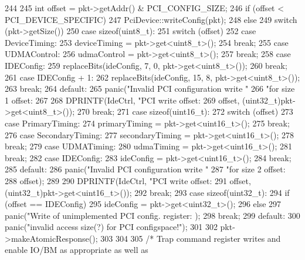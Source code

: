 \begin{DoxyCode}
244 {
245     int offset = pkt->getAddr() & PCI_CONFIG_SIZE;
246     if (offset < PCI_DEVICE_SPECIFIC) {
247         PciDevice::writeConfig(pkt);
248     } else {
249         switch (pkt->getSize()) {
250           case sizeof(uint8_t):
251             switch (offset) {
252               case DeviceTiming:
253                 deviceTiming = pkt->get<uint8_t>();
254                 break;
255               case UDMAControl:
256                 udmaControl = pkt->get<uint8_t>();
257                 break;
258               case IDEConfig:
259                 replaceBits(ideConfig, 7, 0, pkt->get<uint8_t>());
260                 break;
261               case IDEConfig + 1:
262                 replaceBits(ideConfig, 15, 8, pkt->get<uint8_t>());
263                 break;
264               default:
265                 panic("Invalid PCI configuration write "
266                         "for size 1 offset: %
267             }
268             DPRINTF(IdeCtrl, "PCI write offset: %
269                     offset, (uint32_t)pkt->get<uint8_t>());
270             break;
271           case sizeof(uint16_t):
272             switch (offset) {
273               case PrimaryTiming:
274                 primaryTiming = pkt->get<uint16_t>();
275                 break;
276               case SecondaryTiming:
277                 secondaryTiming = pkt->get<uint16_t>();
278                 break;
279               case UDMATiming:
280                 udmaTiming = pkt->get<uint16_t>();
281                 break;
282               case IDEConfig:
283                 ideConfig = pkt->get<uint16_t>();
284                 break;
285               default:
286                 panic("Invalid PCI configuration write "
287                         "for size 2 offset: %
288                         offset);
289             }
290             DPRINTF(IdeCtrl, "PCI write offset: %
291                     offset, (uint32_t)pkt->get<uint16_t>());
292             break;
293           case sizeof(uint32_t):
294             if (offset == IDEConfig)
295                 ideConfig = pkt->get<uint32_t>();
296             else
297                 panic("Write of unimplemented PCI config. register: %
      );
298             break;
299           default:
300             panic("invalid access size(?) for PCI configspace!\n");
301         }
302         pkt->makeAtomicResponse();
303     }
304 
305     /* Trap command register writes and enable IO/BM as appropriate as well as
}
\end{DoxyCode}
